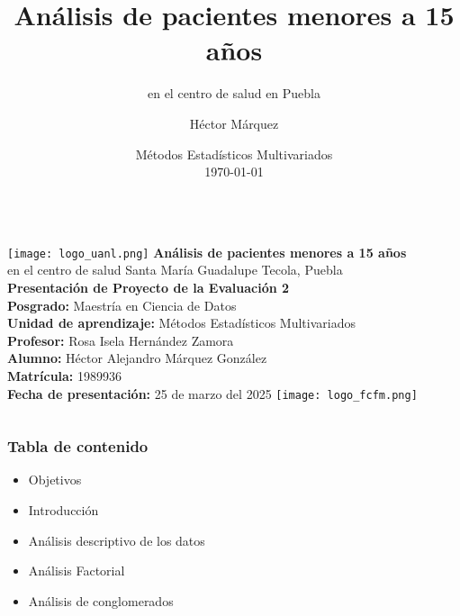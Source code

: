 \documentclass[
	11pt, %
]{beamer}
\title[Análisis de pacientes]{Análisis de pacientes menores a 15 años} %
\subtitle{en el centro de salud en Puebla} %
\author[Héctor Márquez]{Héctor Márquez} %
\institute[UANL]{Universidad Autónoma de Nuevo León\\ \smallskip \textit{hector.marquez@uanl.edu.mx}} %
\date[\today]{Métodos Estadísticos Multivariados \\ \today} %
\begin{document}

\begin{frame}
    \begin{columns}
            \texttt{[image: logo\_uanl.png]}
            \centering
            {\Large \textbf{Análisis de pacientes menores a 15 años}}\\[0.3cm]
            {\small en el centro de salud Santa María Guadalupe Tecola, Puebla}\\[0.5cm]
            {\normalsize \textbf{Presentación de Proyecto de la Evaluación 2}}\\[0.3cm]
            \textbf{Posgrado:} Maestría en Ciencia de Datos\\
            \textbf{Unidad de aprendizaje:} Métodos Estadísticos Multivariados\\[0.3cm]
            \textbf{Profesor:} Rosa Isela Hernández Zamora\\
            \textbf{Alumno:} Héctor Alejandro Márquez González\\
            \textbf{Matrícula:} 1989936\\[0.3cm]
            \textbf{Fecha de presentación:} 25 de marzo del 2025
            \texttt{[image: logo\_fcfm.png]}
    \end{columns}
\end{frame}



\begin{frame}
    \frametitle{Tabla de contenido} %
    \begin{itemize}
        \item Objetivos
        \item Introducción
        \item Análisis descriptivo de los datos
        \item Análisis Factorial
        \item Análisis de conglomerados 
    \end{itemize}
\end{frame}
\end{document}
